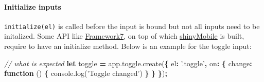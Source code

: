 \documentclass[]{book}
\newenvironment{Shaded}{\begin{snugshade}}{\end{snugshade}}
\newcommand{\AttributeTok}[1]{\textcolor[rgb]{0.77,0.63,0.00}{#1}}
\newcommand{\CommentTok}[1]{\textcolor[rgb]{0.56,0.35,0.01}{\textit{#1}}}
\newcommand{\ControlFlowTok}[1]{\textcolor[rgb]{0.13,0.29,0.53}{\textbf{#1}}}
\newcommand{\DataTypeTok}[1]{\textcolor[rgb]{0.13,0.29,0.53}{#1}}
\newcommand{\KeywordTok}[1]{\textcolor[rgb]{0.13,0.29,0.53}{\textbf{#1}}}
\newcommand{\NormalTok}[1]{#1}
\newcommand{\OperatorTok}[1]{\textcolor[rgb]{0.81,0.36,0.00}{\textbf{#1}}}
\newcommand{\StringTok}[1]{\textcolor[rgb]{0.31,0.60,0.02}{#1}}
\newcommand{\VariableTok}[1]{\textcolor[rgb]{0.00,0.00,0.00}{#1}}
\let\oldparagraph\paragraph
\renewcommand{\paragraph}[1]{\oldparagraph{#1}\mbox{}}
\begin{document}
\begin{Shaded}
\end{Shaded}

\hypertarget{initialize-inputs}{%
\paragraph{Initialize inputs}\label{initialize-inputs}}

\texttt{initialize(el)} is called before the input is bound but not all inputs need to be initalized. Some API like \href{https://framework7.io}{Framework7}, on top of which \href{https://github.com/RinteRface/shinyMobile}{shinyMobile} is built, require to have an initialize method. Below is an example for the toggle input:

\begin{Shaded}
\begin{Highlighting}[]
\CommentTok{// what is expected}
\KeywordTok{let}\NormalTok{ toggle }\OperatorTok{=} \VariableTok{app}\NormalTok{.}\VariableTok{toggle}\NormalTok{.}\AttributeTok{create}\NormalTok{(}\OperatorTok{\{}
  \DataTypeTok{el}\OperatorTok{:} \StringTok{'.toggle'}\OperatorTok{,}
  \DataTypeTok{on}\OperatorTok{:} \OperatorTok{\{}
    \DataTypeTok{change}\OperatorTok{:} \KeywordTok{function}\NormalTok{ () }\OperatorTok{\{}
      \VariableTok{console}\NormalTok{.}\AttributeTok{log}\NormalTok{(}\StringTok{'Toggle changed'}\NormalTok{)}
    \OperatorTok{\}}
  \OperatorTok{\}}
\OperatorTok{\}}\NormalTok{)}\OperatorTok{;}
\end{Highlighting}
\end{Shaded}
\end{document}

